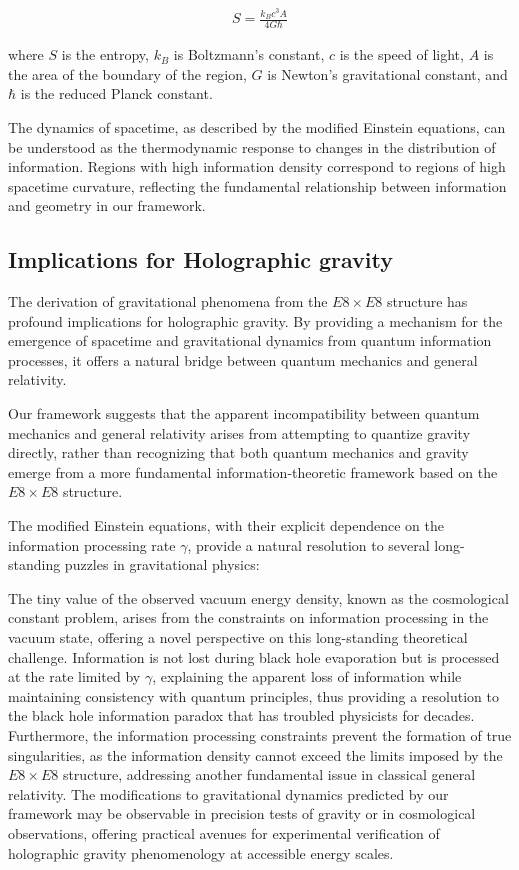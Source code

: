 \documentclass[11pt,english,twoside]{article}
\begin{document}
\begin{align}
    S = \frac{k_B c^3 A}{4G\hbar}
\end{align}

where $S$ is the entropy, $k_B$ is Boltzmann's constant, $c$ is the speed of light, $A$ is the area of the boundary of the region, $G$ is Newton's gravitational constant, and $\hbar$ is the reduced Planck constant.

The dynamics of spacetime, as described by the modified Einstein equations, can be understood as the thermodynamic response to changes in the distribution of information. Regions with high information density correspond to regions of high spacetime curvature, reflecting the fundamental relationship between information and geometry in our framework.

\subsection{Implications for Holographic gravity}

The derivation of gravitational phenomena from the $E8\times E8$ structure has profound implications for holographic gravity. By providing a mechanism for the emergence of spacetime and gravitational dynamics from quantum information processes, it offers a natural bridge between quantum mechanics and general relativity.

Our framework suggests that the apparent incompatibility between quantum mechanics and general relativity arises from attempting to quantize gravity directly, rather than recognizing that both quantum mechanics and gravity emerge from a more fundamental information-theoretic framework based on the $E8\times E8$ structure.

The modified Einstein equations, with their explicit dependence on the information processing rate $\gamma$, provide a natural resolution to several long-standing puzzles in gravitational physics:

The tiny value of the observed vacuum energy density, known as the cosmological constant problem, arises from the constraints on information processing in the vacuum state, offering a novel perspective on this long-standing theoretical challenge. Information is not lost during black hole evaporation but is processed at the rate limited by $\gamma$, explaining the apparent loss of information while maintaining consistency with quantum principles, thus providing a resolution to the black hole information paradox that has troubled physicists for decades. Furthermore, the information processing constraints prevent the formation of true singularities, as the information density cannot exceed the limits imposed by the $E8\times E8$ structure, addressing another fundamental issue in classical general relativity. The modifications to gravitational dynamics predicted by our framework may be observable in precision tests of gravity or in cosmological observations, offering practical avenues for experimental verification of holographic gravity phenomenology at accessible energy scales.
\end{document}
